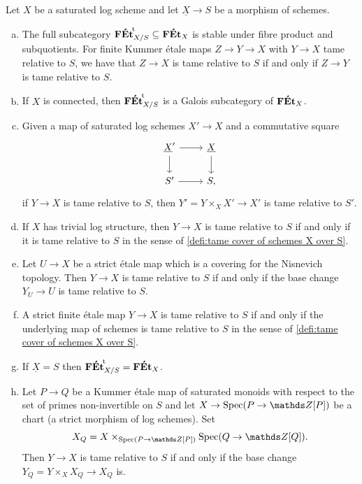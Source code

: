 \begin{lem} \label{lem:tame-log-properties}
    Let $X$ be a saturated log scheme and let $\underline{X}\to S$ be a morphism of schemes. 
    \begin{enumerate}[(a)]
        \item \label{lemitem:tame-log-properties-basic} The full subcategory ${\mathbf{F\acute{E}t}}^{\!\mathrm{t}}_{X/S}\subseteq \mathbf{F\acute{E}t}_X$ is stable under fibre product and subquotients. For finite Kummer \'etale maps $Z\to Y\to X$ with $Y\to X$ tame relative to $S$, we have that $Z\to X$ is tame relative to $S$ if and only if $Z\to Y$ is tame relative to $S$.
        \item \label{lemitem:tame-log-properties-Galois} If $X$ is connected, then ${\mathbf{F\acute{E}t}}^{\!\mathrm{t}}_{X/S}$ is a Galois subcategory of $\mathbf{F\acute{E}t}_X$.
        \item \label{lemitem:tame-log-properties-bc} Given a map of saturated log schemes $X'\to X$ and a commutative square 
        \begin{equation} \label{eqn:tame-log-properties-bc-square}
            \begin{tikzcd}
                \underline{X}'\ar[r] \ar[d] & \underline{X} \ar[d] \\
                S' \ar[r] & S,
            \end{tikzcd}
        \end{equation}
        if $Y\to X$ is tame relative to $S$, then $Y'=Y\times_X X'\to X'$ is tame relative to $S'$. 
        \item \label{lemitem:tame-log-properties-no-log-str} If $X$ has trivial log structure, then $Y\to X$ is tame relative to $S$ if and only if it is tame relative to $S$ in the sense of \cref{defi:tame cover of schemes X over S}.
        \item \label{lemitem:tame-log-properties-tame-local} Let $U\to X$ be a strict \'etale map which is a covering for the Nisnevich topology.
        Then $Y\to X$ is tame relative to $S$ if and only if the base change $Y_U\to U$ is tame relative to $S$.
        \item \label{lemitem:tame-log-properties-strict} A strict finite \'etale map $Y\to X$ is tame relative to $S$ if and only if the underlying map of schemes is tame relative to $S$ in the sense of \cref{defi:tame cover of schemes X over S}. 
        \item \label{lemitem:tame-log-properties-XequalsS} If $\underline{X}=S$ then ${\mathbf{F\acute{E}t}}^{\!\mathrm{t}}_{X/S} = \mathbf{F\acute{E}t}_X$.
        \item \label{lemitem:tame-log-properties-XQ} Let $P\to Q$ be a Kummer \'etale map of saturated monoids with respect to the set of primes non-invertible on $S$ and let $X\to \Spec(P\to \bZ[P])$ be a chart (a strict morphism of log schemes). Set
        \[
            X_Q =  X\times_{\Spec(P\to\bZ[P])} \Spec(Q\to\bZ[Q]) .
        \]
        Then $Y\to X$ is tame relative to $S$ if and only if the base change $Y_Q=Y\times_X X_Q\to X_Q$ is. 
    \end{enumerate}
\end{lem}

